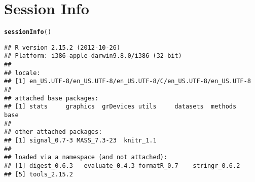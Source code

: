 \documentclass[11pt]{article}\usepackage{graphicx, color}
\makeatletter
\newcommand{\hlfunctioncall}[1]{\textcolor[rgb]{0.501960784313725,0,0.329411764705882}{\textbf{#1}}}%
\newenvironment{kframe}{%
 \def\at@end@of@kframe{}%
 \ifinner\ifhmode%
  \def\at@end@of@kframe{\end{minipage}}%
  \begin{minipage}{\columnwidth}%
 \fi\fi%
 \def\FrameCommand##1{\hskip\@totalleftmargin \hskip-\fboxsep
 \colorbox{shadecolor}{##1}\hskip-\fboxsep
     \hskip-\linewidth \hskip-\@totalleftmargin \hskip\columnwidth}%
 \MakeFramed {\advance\hsize-\width
   \@totalleftmargin\z@ \linewidth\hsize
   \@setminipage}}%
 {\par\unskip\endMakeFramed%
 \at@end@of@kframe}
\newenvironment{knitrout}{}{} %
\makeatother
\begin{document}
\section*{Session Info}
\begin{knitrout}
\color{fgcolor}\begin{kframe}
\begin{alltt}
\hlfunctioncall{sessionInfo}()
\end{alltt}
\begin{verbatim}
## R version 2.15.2 (2012-10-26)
## Platform: i386-apple-darwin9.8.0/i386 (32-bit)
## 
## locale:
## [1] en_US.UTF-8/en_US.UTF-8/en_US.UTF-8/C/en_US.UTF-8/en_US.UTF-8
## 
## attached base packages:
## [1] stats     graphics  grDevices utils     datasets  methods   base     
## 
## other attached packages:
## [1] signal_0.7-3 MASS_7.3-23  knitr_1.1   
## 
## loaded via a namespace (and not attached):
## [1] digest_0.6.3   evaluate_0.4.3 formatR_0.7    stringr_0.6.2 
## [5] tools_2.15.2
\end{verbatim}
\end{kframe}
\end{knitrout}






\printindex
\end{document}
